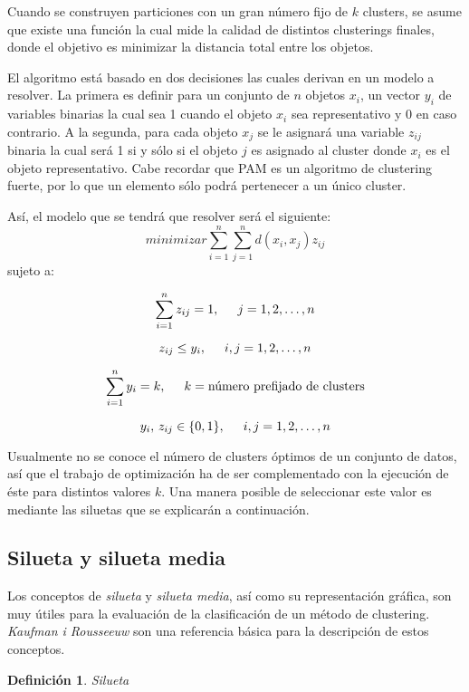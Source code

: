 \documentclass{article}
\newtheorem*{defi} {Definición}
\begin{document}
Cuando se construyen particiones con un gran número fijo de $k$ clusters, se asume que existe una función la cual mide la calidad de distintos clusterings finales, donde el objetivo es minimizar la distancia total entre los objetos.

El algoritmo está basado en dos decisiones las cuales derivan en un modelo a resolver. La primera es definir para un conjunto de $n$ objetos $x_{i}$, un vector $y_{i}$ de variables binarias la cual sea 1 cuando el objeto $x_{i}$ sea representativo y 0 en caso contrario. A la segunda, para cada objeto $x_{j}$ se le asignará una variable $z_{ij}$ binaria la cual será 1 si y sólo si el objeto $j$ es asignado al cluster donde $x_{i}$ es el objeto representativo. Cabe recordar que PAM es un algoritmo de clustering fuerte, por lo que un elemento sólo podrá pertenecer a un único cluster.

Así, el modelo que se tendrá que resolver será el siguiente:
$$
minimizar\sum_{i=1}^{n}\sum_{j=1}^{n}d(x_{i},x_{j})z_{ij}
$$
sujeto a:

$$
\sum_{i=1}^{n}z_{ij}=1, \hspace*{0.5 cm} j=1,2,\dots,n
$$

$$
z_{ij}\leq y_{i}, \hspace*{0.5 cm} i,j=1,2,\dots,n
$$

$$
\sum_{i=1}^{n}y_{i}=k, \hspace*{0.5 cm} k=\text{número prefijado de clusters}
$$

$$
y_{i},\,z_{ij}\in\{0,1\} , \hspace*{0.5 cm} i,j=1,2,\dots,n
$$

Usualmente no se conoce el número de clusters óptimos de un conjunto de datos, así que el trabajo de optimización ha de ser complementado con la ejecución de éste para distintos valores $k$. Una manera posible de seleccionar este valor es mediante las siluetas que se explicarán a continuación.

\subsection{Silueta y silueta media}

Los conceptos de \emph{silueta} y \emph{silueta media}, así como su representación gráfica, son muy útiles para la evaluación de la clasificación de un método de clustering. \emph{Kaufman i Rousseeuw} \cite{fgd} son una referencia básica para la descripción de estos conceptos.

\begin{defi}Silueta
\end{defi}
\end{document}
